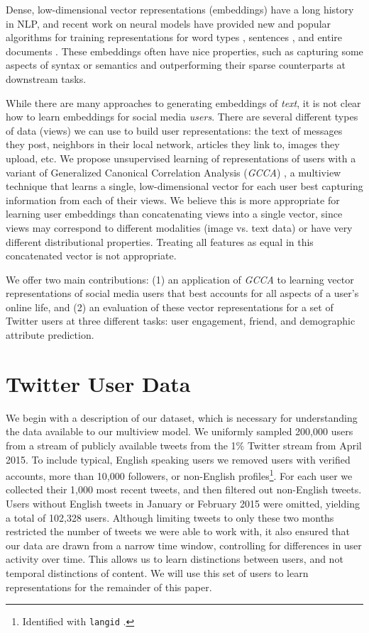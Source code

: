 \documentclass{article}
\newcommand{\gcca}{\emph{GCCA}} %
\begin{document}
Dense, low-dimensional vector representations (embeddings) have a long history in NLP, and recent work on neural models have provided new and 
popular algorithms for training representations for word types \cite{mikolov2013,faruqui2014},
sentences \cite{kiros2015}, and entire documents \cite{le2014}.  These embeddings often have nice properties, such
as capturing some aspects of syntax or semantics and outperforming their sparse counterparts at downstream tasks.

While there
are many approaches to generating embeddings of {\em text}, it is not clear how to learn embeddings for social media {\em users}.
There are several different types of data (views) we can use to build user representations: the text of messages they post,
neighbors in their local network, articles they link to, images they upload, etc. We propose unsupervised learning of representations
of users with a variant of Generalized Canonical Correlation Analysis (\gcca) \cite{carroll1968generalization,van2006,arora2014multi,rastogi2015}, a multiview
technique that learns a single, low-dimensional vector for each user best capturing information from each of their views.  We believe
this is more appropriate for learning user embeddings than concatenating views into a single vector, since 
views may correspond to different modalities (image vs. text data) or have very different distributional properties.  Treating
all features as equal in this concatenated vector is not appropriate.

We offer two main contributions: (1) an application of \gcca{} to learning vector representations of social media users
that best accounts for all aspects of a user's online life, and (2) an evaluation of these vector
representations for a set of Twitter users at three different tasks: user engagement, friend, and demographic
attribute prediction.


\section{Twitter User Data}
\label{sec:data}
We begin with a description of our dataset, which is necessary for understanding the data available to our multiview model.
We uniformly sampled 200,000 users from a stream of publicly available tweets from the 1\% Twitter stream from April 2015.
To include typical, English speaking users we removed users with verified accounts, more than 10,000 followers, or non-English
profiles\footnote{Identified with \texttt{langid} \cite{lui2012langid}.}.
For each user we collected their 1,000 most recent tweets, and then filtered out non-English tweets.
Users without English tweets in January or February 2015 were omitted, yielding a total of 102,328 users.
Although limiting tweets to only these two months restricted the number of tweets we were able to work with, it also ensured that our data are drawn from a narrow time window, controlling for differences in user activity over time. This allows us to learn 
distinctions between users, and not temporal distinctions of content.
We will use this set of users to learn representations for the remainder of this paper. 
\end{document}
